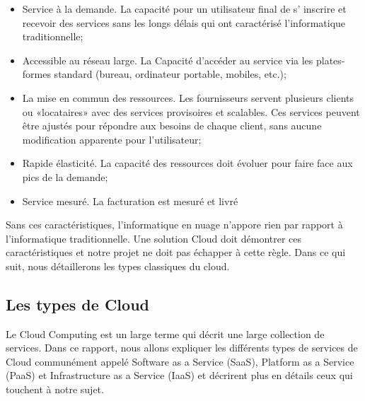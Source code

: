 \begin{onehalfspace}
\begin{itemize}

\item Service à la demande. La capacité pour un utilisateur final de s' inscrire et recevoir des services sans les longs délais qui ont caractérisé l'informatique traditionnelle;

\item Accessible au réseau large. La Capacité d'accéder au service via les plates-formes standard (bureau, ordinateur portable, mobiles, etc.);

\item La mise en commun des ressources. Les fournisseurs servent plusieurs clients ou «locataires» avec des services provisoires et scalables. Ces services peuvent être ajustés pour répondre aux besoins de chaque client, sans aucune modification apparente pour l'utilisateur;

\item Rapide élasticité. La capacité des ressources doit évoluer pour faire face aux pics de la demande;

\item Service mesuré. La facturation est mesuré et livré


\end{itemize}

Sans ces caractéristiques, l'informatique en nuage n'appore rien par rapport à l'informatique traditionnelle. Une solution Cloud doit démontrer ces caractéristiques et notre projet ne doit pas échapper à cette règle. Dans ce qui suit, nous détaillerons les types classiques du cloud.

\subsection{Les types de Cloud}

Le Cloud Computing est un large terme qui décrit une large collection de services. Dans ce rapport, nous allons expliquer les différents types de services de Cloud communément appelé Software as a Service (SaaS),  Platform as a Service (PaaS) et Infrastructure as a Service (IaaS) et décrirent plus en détails ceux qui touchent à notre sujet.


\end{onehalfspace}
